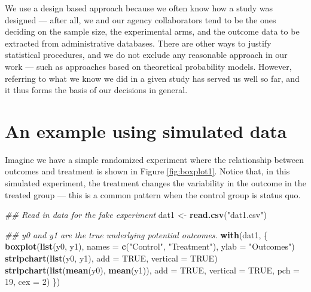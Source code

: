 \documentclass[
  12pt,
]{book}
\newenvironment{Shaded}{\begin{snugshade}}{\end{snugshade}}
\newcommand{\CommentTok}[1]{\textcolor[rgb]{0.56,0.35,0.01}{\textit{#1}}}
\newcommand{\DataTypeTok}[1]{\textcolor[rgb]{0.13,0.29,0.53}{#1}}
\newcommand{\DecValTok}[1]{\textcolor[rgb]{0.00,0.00,0.81}{#1}}
\newcommand{\KeywordTok}[1]{\textcolor[rgb]{0.13,0.29,0.53}{\textbf{#1}}}
\newcommand{\NormalTok}[1]{#1}
\newcommand{\OtherTok}[1]{\textcolor[rgb]{0.56,0.35,0.01}{#1}}
\newcommand{\StringTok}[1]{\textcolor[rgb]{0.31,0.60,0.02}{#1}}
\theoremstyle{definition}
\theoremstyle{definition}
\theoremstyle{definition}
\theoremstyle{remark}
\begin{document}
We use a design based approach because we often know how a study was
designed --- after all, we and our agency collaborators tend to be the
ones deciding on the sample size, the experimental arms, and the outcome
data to be extracted from administrative databases. There are other ways
to justify statistical procedures, and we do not exclude any reasonable
approach in our work --- such as approaches based on theoretical
probability models. However, referring to what we know we did in a given
study has served us well so far, and it thus forms the basis of our
decisions in general.

\hypertarget{randinfex}{%
\section{An example using simulated data}\label{randinfex}}

Imagine we have a simple randomized experiment where the relationship
between outcomes and treatment is shown in Figure \ref{fig:boxplot1}.
Notice that, in this simulated experiment, the treatment changes the
variability in the outcome in the treated group --- this is a common
pattern when the control group is status quo.

\begin{Shaded}
\begin{Highlighting}[]
\CommentTok{## Read in data for the fake experiment}
\NormalTok{dat1 <-}\StringTok{ }\KeywordTok{read.csv}\NormalTok{(}\StringTok{"dat1.csv"}\NormalTok{)}
\end{Highlighting}
\end{Shaded}

\begin{Shaded}
\begin{Highlighting}[]
\CommentTok{## y0 and y1 are the true underlying potential outcomes.}
\KeywordTok{with}\NormalTok{(dat1, \{}
  \KeywordTok{boxplot}\NormalTok{(}\KeywordTok{list}\NormalTok{(y0, y1), }\DataTypeTok{names =} \KeywordTok{c}\NormalTok{(}\StringTok{"Control"}\NormalTok{, }\StringTok{"Treatment"}\NormalTok{), }\DataTypeTok{ylab =} \StringTok{"Outcomes"}\NormalTok{)}
  \KeywordTok{stripchart}\NormalTok{(}\KeywordTok{list}\NormalTok{(y0, y1), }\DataTypeTok{add =} \OtherTok{TRUE}\NormalTok{, }\DataTypeTok{vertical =} \OtherTok{TRUE}\NormalTok{)}
  \KeywordTok{stripchart}\NormalTok{(}\KeywordTok{list}\NormalTok{(}\KeywordTok{mean}\NormalTok{(y0), }\KeywordTok{mean}\NormalTok{(y1)), }\DataTypeTok{add =} \OtherTok{TRUE}\NormalTok{, }\DataTypeTok{vertical =} \OtherTok{TRUE}\NormalTok{, }\DataTypeTok{pch =} \DecValTok{19}\NormalTok{, }\DataTypeTok{cex =} \DecValTok{2}\NormalTok{)}
\NormalTok{\})}
\end{Highlighting}
\end{Shaded}
\end{document}
